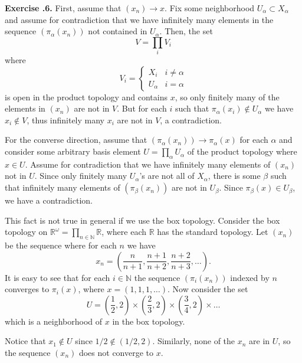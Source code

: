 \documentclass{article}
\theoremstyle{definition}
\theoremstyle{remark}
\newenvironment{exc}[1]{\noindent\textbf{Exercise \thesubsection.#1.}}{\medskip}
\newcommand{\N}{\mathbb{N}}
\newcommand{\R}{\mathbb{R}}
\newcommand{\paren}[1]{\left( #1 \right)}
\begin{document}
\begin{exc}{6}
    First, assume that $(x_n) \to x$. Fix some neighborhood $U_\alpha \subset X_\alpha$ and assume for contradiction that we have infinitely many elements in the sequence $(\pi_\alpha(x_n))$ not contained in $U_\alpha$. Then, the set
    \begin{equation*}
        V = \prod_i V_i
    \end{equation*} where 
    \begin{equation*}
        V_i = 
        \begin{cases}
        X_i & i \neq \alpha \\
        U_\alpha & i = \alpha
        \end{cases}
    \end{equation*} is open in the product topology and contains $x$, so only finitely many of the elements in $(x_n)$ are not in $V$. But for each $i$ such that $\pi_\alpha(x_i) \notin U_\alpha$ we have $x_i \notin V$, thus infinitely many $x_i$ are not in $V$, a contradiction.
    
    For the converse direction, assume that $(\pi_\alpha(x_n)) \to \pi_\alpha(x)$ for each $\alpha$ and consider some arbitrary basis element $U = \prod_\alpha U_\alpha$ of the product topology where $x \in U$. Assume for contradiction that we have infinitely many elements of $(x_n)$ not in $U$. Since only finitely many $U_\alpha$'s are not all of $X_\alpha$, there is some $\beta$ such that infinitely many elements of $(\pi_\beta(x_n))$ are not in $U_\beta$. Since $\pi_\beta(x) \in U_\beta$, we have a contradiction.
    
    This fact is not true in general if we use the box topology. Consider the box topology on $\R^\omega = \prod_{n \in \N} \R$, where each $\R$ has the standard topology. Let $(x_n)$ be the sequence where for each $n$ we have
    \begin{equation*}
        x_n = \paren{\frac{n}{n+1},\frac{n+1}{n+2}, \frac{n+2}{n+3}, \dots}.
    \end{equation*} It is easy to see that for each $i \in \N$ the sequence $(\pi_i(x_n))$ indexed by $n$ converges to $\pi_i(x)$, where $x = (1,1,1, \dots)$. Now consider the set 
    \begin{equation*}
        U = \paren{\frac{1}{2}, 2} \times \paren{\frac{2}{3}, 2} \times \paren{\frac{3}{4}, 2} \times \dots
    \end{equation*} which is a neighborhood of $x$ in the box topology.
    
    Notice that $x_1 \notin U$ since $1/2 \notin (1/2, 2)$. Similarly, none of the $x_n$ are in $U$, so the sequence $(x_n)$ does not converge to $x$.
\end{exc}
\end{document}
